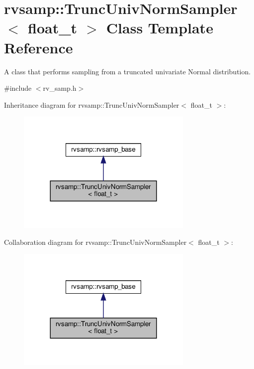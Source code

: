 \hypertarget{classrvsamp_1_1TruncUnivNormSampler}{}\section{rvsamp\+:\+:Trunc\+Univ\+Norm\+Sampler$<$ float\+\_\+t $>$ Class Template Reference}
\label{classrvsamp_1_1TruncUnivNormSampler}


A class that performs sampling from a truncated univariate Normal distribution.  




{\ttfamily \#include $<$rv\+\_\+samp.\+h$>$}



Inheritance diagram for rvsamp\+:\+:Trunc\+Univ\+Norm\+Sampler$<$ float\+\_\+t $>$\+:\nopagebreak
\begin{figure}[H]
\begin{center}
\leavevmode
\includegraphics[width=240pt]{classrvsamp_1_1TruncUnivNormSampler__inherit__graph}
\end{center}
\end{figure}


Collaboration diagram for rvsamp\+:\+:Trunc\+Univ\+Norm\+Sampler$<$ float\+\_\+t $>$\+:\nopagebreak
\begin{figure}[H]
\begin{center}
\leavevmode
\includegraphics[width=240pt]{classrvsamp_1_1TruncUnivNormSampler__coll__graph}
\end{center}
\end{figure}
